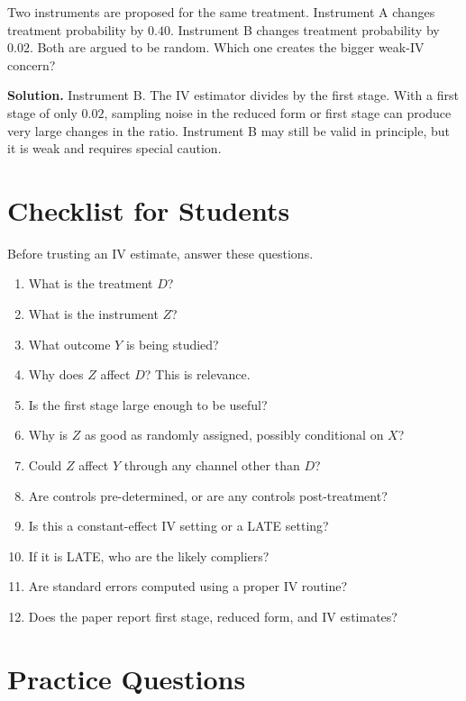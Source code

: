Two instruments are proposed for the same treatment. Instrument A changes
treatment probability by $0.40$. Instrument B changes treatment probability by
$0.02$. Both are argued to be random. Which one creates the bigger weak-IV
concern?

\textbf{Solution.} Instrument B. The IV estimator divides by the first stage.
With a first stage of only $0.02$, sampling noise in the reduced form or first
stage can produce very large changes in the ratio. Instrument B may still be
valid in principle, but it is weak and requires special caution.

\section{Checklist for Students}

Before trusting an IV estimate, answer these questions.
\begin{enumerate}
  \item What is the treatment $D$?
  \item What is the instrument $Z$?
  \item What outcome $Y$ is being studied?
  \item Why does $Z$ affect $D$? This is relevance.
  \item Is the first stage large enough to be useful?
  \item Why is $Z$ as good as randomly assigned, possibly conditional on $X$?
  \item Could $Z$ affect $Y$ through any channel other than $D$?
  \item Are controls pre-determined, or are any controls post-treatment?
  \item Is this a constant-effect IV setting or a LATE setting?
  \item If it is LATE, who are the likely compliers?
  \item Are standard errors computed using a proper IV routine?
  \item Does the paper report first stage, reduced form, and IV estimates?
\end{enumerate}

\section{Practice Questions}

